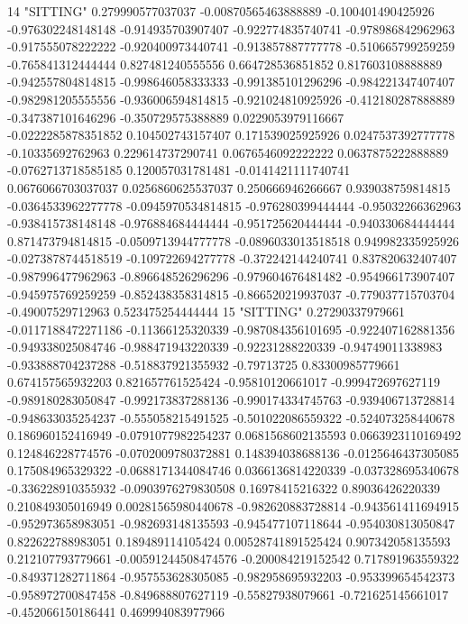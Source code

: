 14 "SITTING" 0.279990577037037 -0.00870565463888889 -0.100401490425926 -0.976302248148148 -0.914935703907407 -0.922774835740741 -0.978986842962963 -0.917555078222222 -0.920400973440741 -0.913857887777778 -0.510665799259259 -0.765841312444444 0.827481240555556 0.664728536851852 0.817603108888889 -0.942557804814815 -0.998646058333333 -0.991385101296296 -0.984221347407407 -0.982981205555556 -0.936006594814815 -0.921024810925926 -0.412180287888889 -0.347387101646296 -0.350729575388889 0.0229053979116667 -0.0222285878351852 0.104502743157407 0.171539025925926 0.0247537392777778 -0.10335692762963 0.229614737290741 0.0676546092222222 0.0637875222888889 -0.0762713718585185 0.120057031781481 -0.0141421111740741 0.0676066703037037 0.0256860625537037 0.250666946266667 0.939038759814815 -0.0364533962277778 -0.0945970534814815 -0.976280399444444 -0.95032266362963 -0.938415738148148 -0.976884684444444 -0.951725620444444 -0.940330684444444 0.871473794814815 -0.0509713944777778 -0.0896033013518518 0.949982335925926 -0.0273878744518519 -0.109722694277778 -0.372242144240741 0.837820632407407 -0.987996477962963 -0.896648526296296 -0.979604676481482 -0.954966173907407 -0.945975769259259 -0.852438358314815 -0.866520219937037 -0.779037715703704 -0.49007529712963 0.523475254444444
15 "SITTING" 0.27290337979661 -0.0117188472271186 -0.11366125320339 -0.987084356101695 -0.922407162881356 -0.949338025084746 -0.988471943220339 -0.92231288220339 -0.94749011338983 -0.933888704237288 -0.518837921355932 -0.79713725 0.83300985779661 0.674157565932203 0.821657761525424 -0.95810120661017 -0.999472697627119 -0.989180283050847 -0.992173837288136 -0.990174334745763 -0.939406713728814 -0.948633035254237 -0.555058215491525 -0.501022086559322 -0.524073258440678 0.186960152416949 -0.0791077982254237 0.0681568602135593 0.0663923110169492 0.124846228774576 -0.0702009780372881 0.148394038688136 -0.0125646437305085 0.175084965329322 -0.0688171344084746 0.0366136814220339 -0.037328695340678 -0.336228910355932 -0.0903976279830508 0.16978415216322 0.89036426220339 0.210849305016949 0.00281565980440678 -0.982620883728814 -0.943561411694915 -0.952973658983051 -0.982693148135593 -0.945477107118644 -0.954030813050847 0.822622788983051 0.189489114105424 0.00528741891525424 0.907342058135593 0.212107793779661 -0.00591244508474576 -0.200084219152542 0.717891963559322 -0.849371282711864 -0.957553628305085 -0.982958695932203 -0.953399654542373 -0.958972700847458 -0.849688807627119 -0.55827938079661 -0.721625145661017 -0.452066150186441 0.469994083977966
